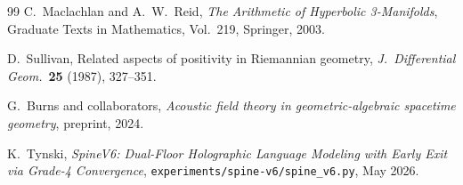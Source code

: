 \documentclass[11pt,a4paper]{article}
\theoremstyle{plain}
\theoremstyle{definition}
\theoremstyle{remark}
\numberwithin{equation}{section}
\begin{document}
\begin{thebibliography}{99}
C.~Maclachlan and A.~W.~Reid,
\emph{The Arithmetic of Hyperbolic 3-Manifolds},
Graduate Texts in Mathematics, Vol.~219, Springer, 2003.

D.~Sullivan,
Related aspects of positivity in Riemannian geometry,
\emph{J.\ Differential Geom.}\ \textbf{25} (1987), 327--351.

G.~Burns and collaborators,
\emph{Acoustic field theory in geometric-algebraic spacetime
geometry},
preprint, 2024.

K.~Tynski,
\emph{SpineV6: Dual-Floor Holographic Language Modeling with
Early Exit via Grade-4 Convergence},
\texttt{experiments/spine-v6/spine\_v6.py}, May 2026.

\end{thebibliography}
\end{document}
